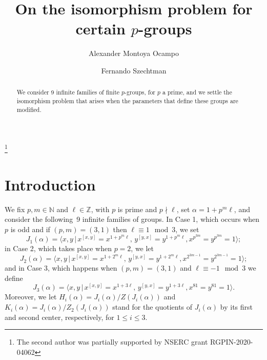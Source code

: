 \documentclass{amsart}
\theoremstyle{definition}
\theoremstyle{remark}
\newcommand \Z{{\mathbb Z}}
\newcommand \N{{\mathbb N}}
\begin{document}
\title[On the isomorphism problem for certain $p$-groups]{On the isomorphism problem for certain $p$-groups}

\author{Alexander Montoya Ocampo}
\address{Department of Mathematics and Statistics, University of Regina, Canada}




\author{Fernando Szechtman}
\address{Department of Mathematics and Statistics, University of Regina, Canada}
\thanks{The second author was partially supported by NSERC grant RGPIN-2020-04062}






\begin{abstract} We consider 9 infinite families of finite $p$-groups, for $p$ a prime, and we settle
the isomorphism problem that arises when the parameters that define these groups are modified.
\end{abstract}

\maketitle

\section{Introduction}


We fix $p,m\in\N$ and $\ell\in\Z$, with $p$ is prime and $p\nmid\ell$, set $\alpha=1+p^m\ell$, and consider the
following~9 infinite families of groups. In Case 1, which occurs when $p$ is odd and if $(p,m)=(3,1)$ then $\ell\equiv 1\mod 3$,
we set
\begin{equation}\label{j1}
J_1(\alpha)=\langle x,y\,|\, x^{[x,y]}=x^{1+p^m\ell},\, y^{[y,x]}=y^{1+p^m\ell}, x^{p^{3m}}=y^{p^{3m}}=1\rangle;
\end{equation}
in Case 2, which takes place when $p=2$, we let
\begin{equation}\label{j2}
J_2(\alpha)=\langle x,y\,|\, x^{[x,y]}=x^{1+2^m\ell},\, y^{[y,x]}=y^{1+2^m\ell}, x^{2^{3m-1}}=y^{2^{3m-1}}=1\rangle;
\end{equation}
and in Case 3, which happens when $(p,m)=(3,1)$ and $\ell\equiv -1\mod 3$ we define
\begin{equation}\label{j3}
J_3(\alpha)=\langle x,y\,|\, x^{[x,y]}=x^{1+3\ell},\, y^{[y,x]}=y^{1+3\ell}, x^{81}=y^{81}=1\rangle.
\end{equation}
Moreover, we let $H_i(\alpha)=J_i(\alpha)/Z(J_i(\alpha))$ and $K_i(\alpha)=J_i(\alpha)/Z_2(J_i(\alpha))$
stand for the quotients of $J_i(\alpha)$ by its first and second center, respectively, for $1\leq i\leq 3$.
\end{document}
